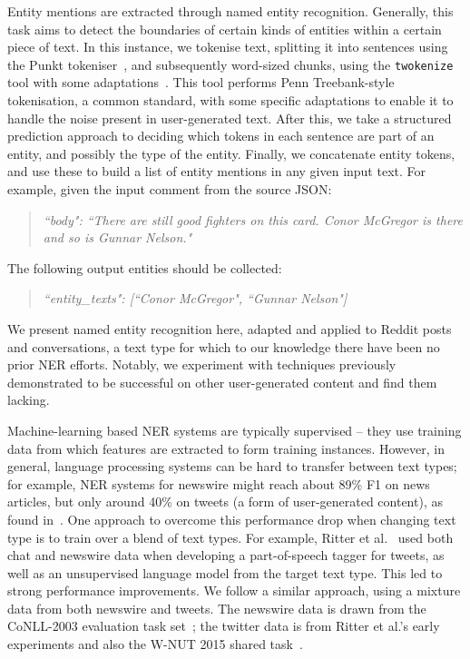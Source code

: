 \documentclass[sigconf,anonymous,review]{acmart}
\begin{document}
Entity mentions are extracted through named entity recognition.
Generally, this task aims to detect the boundaries of certain kinds of entities within a certain piece of text.
In this instance, we tokenise text, splitting it into sentences using the Punkt tokeniser~\cite{kiss2006unsupervised}, and subsequently word-sized chunks, using the {\tt twokenize} tool with some adaptations~\cite{o2010tweetmotif}.
This tool performs Penn Treebank-style tokenisation, a common standard, with some specific adaptations to enable it to handle the noise present in user-generated text.
After this, we take a structured prediction approach to deciding which tokens in each sentence are part of an entity, and possibly the type of the entity.
Finally, we concatenate entity tokens, and use these to build a list of entity mentions in any given input text.
For example, given the input comment from the source JSON:

\begin{quote}
\emph{``body": ``There are still good fighters on this card. Conor McGregor is there and so is Gunnar Nelson."}
\end{quote}

The following output entities should be collected:

\begin{quote}
\emph{``entity\_texts": [``Conor McGregor", ``Gunnar Nelson"]}
\end{quote}

We present named entity recognition here, adapted and applied to Reddit posts and conversations, a text type for which to our knowledge there have been no prior NER efforts.
Notably, we experiment with techniques previously demonstrated to be successful on other user-generated content and find them lacking.

Machine-learning based NER systems are typically supervised -- they use training data from which features are extracted to form training instances.
However, in general, language processing systems can be hard to transfer between text types; for example, NER systems for newswire might reach about 89\% F1 on news articles, but only around 40\% on tweets (a form of user-generated content), as found in~\cite{derczynski2015analysis}.
One approach to overcome this performance drop when changing text type is to train over a blend of text types.
For example, Ritter et al.~\cite{ritter2011named} used both chat %
and newswire data when developing a part-of-speech tagger for tweets, as well as an unsupervised language model from the target text type.
This led to strong performance improvements.
We follow a similar approach, using a mixture data from both newswire and tweets.
The newswire data is drawn from the CoNLL-2003 evaluation task set~\cite{tjong2003introduction}; the twitter data is from Ritter et al.'s early experiments and also the W-NUT 2015 shared task~\cite{ritter2011named,baldwin2015shared}.
\end{document}
